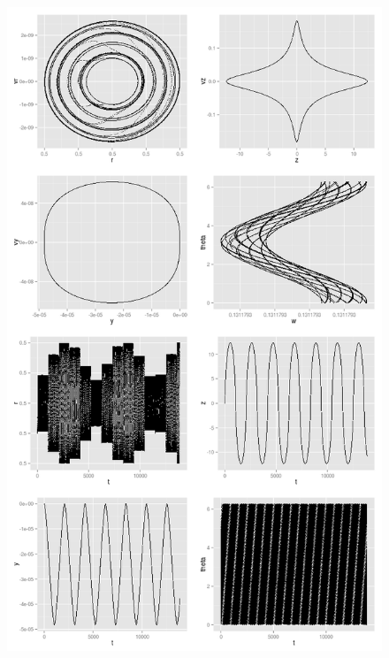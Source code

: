 \documentclass{article}
\begin{document}
\begin{figure}[h]
    \begin{center}
        \includegraphics[height=7.75in]{./img/example.png}
    \end{center}
\label{fig:example}
\end{figure}
\end{document}
